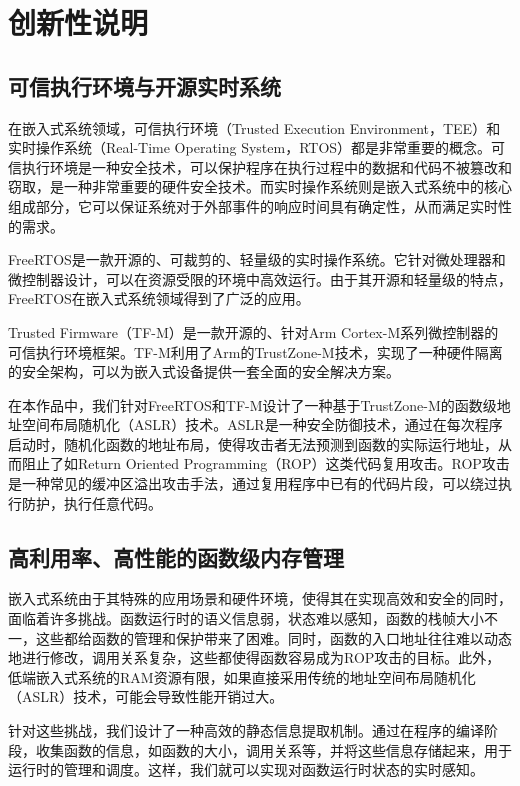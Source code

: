 \documentclass[12pt,a4paper]{ctexart}
\numberwithin{figure}{section}
\begin{document}
\section{创新性说明}
\subsection{可信执行环境与开源实时系统}
\par 在嵌入式系统领域，可信执行环境（Trusted Execution Environment，TEE）和实时操作系统（Real-Time Operating System，RTOS）都是非常重要的概念。可信执行环境是一种安全技术，可以保护程序在执行过程中的数据和代码不被篡改和窃取，是一种非常重要的硬件安全技术。而实时操作系统则是嵌入式系统中的核心组成部分，它可以保证系统对于外部事件的响应时间具有确定性，从而满足实时性的需求。

\par FreeRTOS是一款开源的、可裁剪的、轻量级的实时操作系统。它针对微处理器和微控制器设计，可以在资源受限的环境中高效运行。由于其开源和轻量级的特点，FreeRTOS在嵌入式系统领域得到了广泛的应用。

\par Trusted Firmware（TF-M）是一款开源的、针对Arm Cortex-M系列微控制器的可信执行环境框架。TF-M利用了Arm的TrustZone-M技术，实现了一种硬件隔离的安全架构，可以为嵌入式设备提供一套全面的安全解决方案。

\par 在本作品中，我们针对FreeRTOS和TF-M设计了一种基于TrustZone-M的函数级地址空间布局随机化（ASLR）技术。ASLR是一种安全防御技术，通过在每次程序启动时，随机化函数的地址布局，使得攻击者无法预测到函数的实际运行地址，从而阻止了如Return Oriented Programming（ROP）这类代码复用攻击。ROP攻击是一种常见的缓冲区溢出攻击手法，通过复用程序中已有的代码片段，可以绕过执行防护，执行任意代码。

\subsection{高利用率、高性能的函数级内存管理}
\par 嵌入式系统由于其特殊的应用场景和硬件环境，使得其在实现高效和安全的同时，面临着许多挑战。函数运行时的语义信息弱，状态难以感知，函数的栈帧大小不一，这些都给函数的管理和保护带来了困难。同时，函数的入口地址往往难以动态地进行修改，调用关系复杂，这些都使得函数容易成为ROP攻击的目标。此外，低端嵌入式系统的RAM资源有限，如果直接采用传统的地址空间布局随机化（ASLR）技术，可能会导致性能开销过大。

\par 针对这些挑战，我们设计了一种高效的静态信息提取机制。通过在程序的编译阶段，收集函数的信息，如函数的大小，调用关系等，并将这些信息存储起来，用于运行时的管理和调度。这样，我们就可以实现对函数运行时状态的实时感知。
\end{document}
